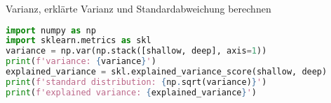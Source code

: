 Varianz, erklärte Varianz und Standardabweichung berechnen

\begin{lstlisting}[language=Python]
import numpy as np
import sklearn.metrics as skl
variance = np.var(np.stack([shallow, deep], axis=1))
print(f'variance: {variance}')
explained_variance = skl.explained_variance_score(shallow, deep)
print(f'standard distribution: {np.sqrt(variance)}')
print(f'explained variance: {explained_variance}')
\end{lstlisting}

